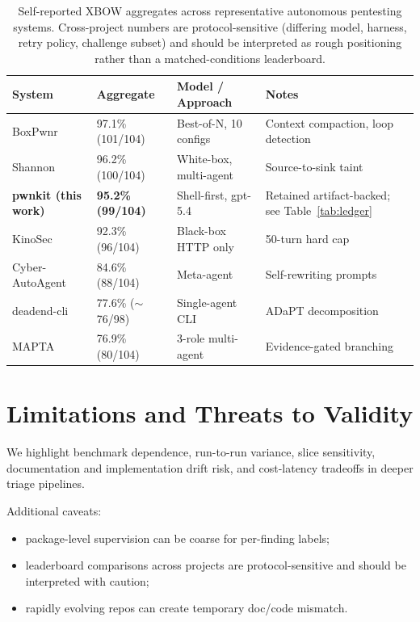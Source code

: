 \documentclass[11pt]{article}
\begin{document}
\begin{table}[ht]
\centering
\small
\begin{tabular}{llll}
\toprule
System & Aggregate & Model / Approach & Notes \\
\midrule
BoxPwnr\citep{boxpwnr}             & 97.1\% (101/104) & Best-of-N, 10 configs  & Context compaction, loop detection \\
Shannon\citep{shannon}              & 96.2\% (100/104) & White-box, multi-agent & Source-to-sink taint \\
\textbf{pwnkit (this work)}         & \textbf{95.2\% (99/104)} & Shell-first, gpt-5.4   & Retained artifact-backed; see Table~\ref{tab:ledger} \\
KinoSec\citep{kinosec}              & 92.3\% (96/104)  & Black-box HTTP only    & 50-turn hard cap \\
Cyber-AutoAgent\citep{cyberautoagent} & 84.6\% (88/104)  & Meta-agent             & Self-rewriting prompts \\
deadend-cli\citep{deadend}          & 77.6\% ($\sim$76/98) & Single-agent CLI     & ADaPT decomposition \\
MAPTA\citep{mapta}                  & 76.9\% (80/104)  & 3-role multi-agent     & Evidence-gated branching \\
\bottomrule
\end{tabular}
\caption{Self-reported XBOW aggregates across representative autonomous pentesting systems. Cross-project numbers are protocol-sensitive (differing model, harness, retry policy, challenge subset) and should be interpreted as rough positioning rather than a matched-conditions leaderboard.}
\label{tab:competitors}
\end{table}

\section{Limitations and Threats to Validity}

We highlight benchmark dependence, run-to-run variance, slice sensitivity,
documentation and implementation drift risk, and cost-latency tradeoffs in deeper
triage pipelines.

Additional caveats:
\begin{itemize}
  \item package-level supervision can be coarse for per-finding labels;
  \item leaderboard comparisons across projects are protocol-sensitive and
  should be interpreted with caution;
  \item rapidly evolving repos can create temporary doc/code mismatch.
\end{itemize}
\end{document}
